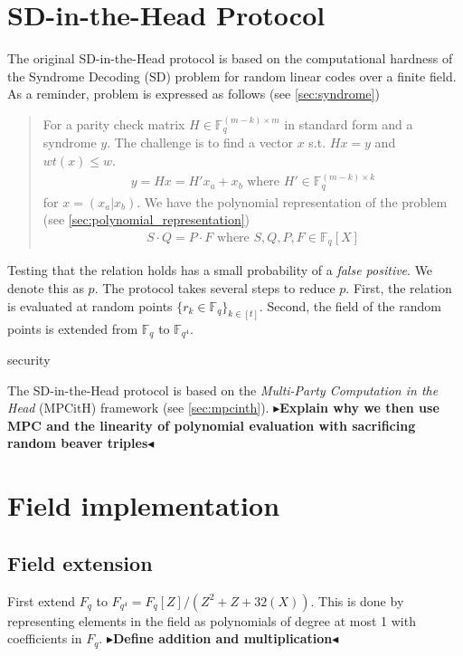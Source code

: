 \documentclass[twoside,11pt]{report}
\theoremstyle{definition}
\theoremstyle{plain}
\newcommand{\todo}[1]{{\color[rgb]{.5,0,0}\textbf{$\blacktriangleright$#1$\blacktriangleleft$}}}
\begin{document}
\section{SD-in-the-Head Protocol}
The original SD-in-the-Head protocol is based on the computational hardness of the Syndrome Decoding (SD) problem for random linear codes over a finite field. As a reminder, problem is expressed as follows (see \autoref{sec:syndrome})
\begin{quote}
  For a parity check matrix $H \in \mathbb{F}_q^{(m-k)\times m}$ in standard form and a syndrome $y$. The challenge is to find a vector $x$ s.t. $Hx = y$ and $wt(x) \leq w$.
  \begin{align*}
    y = Hx = H'x_a + x_b \text{ \ \ \ where \ \ \ } H' \in \mathbb{F}_q^{(m-k)\times k}
  \end{align*}
  for $x = (x_a | x_b)$. We have the polynomial representation of the problem (see \autoref{sec:polynomial_representation})
  \begin{align*}
    S\cdot Q = P\cdot F \text{ \ \ \ where \ \ \ } S, Q, P, F \in \mathbb{F}_q[X]
  \end{align*}
\end{quote}
\noindent Testing that the relation holds has a small probability of a \textit{false positive}. We denote this as $p$. The protocol takes several steps to reduce $p$. First, the relation is evaluated at random points $\{r_k \in \mathbb{F}_q{\}}_{k\in[t]}$. Second, the field of the random points is extended from $\mathbb{F}_q$ to $\mathbb{F}_{q^4}$.

security

The SD-in-the-Head protocol is based on the \textit{Multi-Party Computation in the Head} (MPCitH) framework (see \autoref{sec:mpcinth}). \todo{Explain why we then use MPC and the linearity of polynomial evaluation with sacrificing random beaver triples}

\section{Field implementation}

\subsection{Field extension}

First extend $F_q$ to $F_{q^4} = F_q[Z] / (Z^2 + Z + 32(X))$. This is done by representing elements in the field as polynomials of degree at most 1 with coefficients in $F_q$. \todo{Define addition and multiplication}
\end{document}
